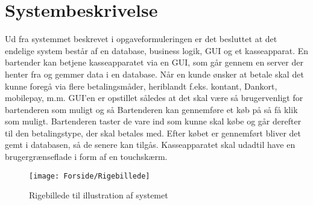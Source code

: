 \chapter{Systembeskrivelse}
Ud fra systemmet beskrevet i opgaveformuleringen er det besluttet at det endelige system består af en database, business logik, GUI og et kasseapparat. 
\newline
\newline
En bartender kan betjene kasseapparatet via en GUI, som går gennem en server der henter fra og gemmer data i en database.
Når en kunde ønsker at betale skal det kunne foregå via flere betalingsmåder, heriblandt f.eks. kontant, Dankort, mobilepay, m.m.
\newline
\newline
GUI'en er opstillet således at det skal være så brugervenligt for bartenderen som muligt og så Bartenderen kan gennemføre et køb på så få klik som muligt. Bartenderen taster de vare ind som kunne skal købe og går derefter til den betalingstype, der skal betales med. Efter købet er gennemført bliver det gemt i databasen, så de senere kan tilgås. 
\newline
\newline
Kasseapparatet skal udadtil have en brugergrænseflade i form af en touchskærm. 
                  
\begin{figure}[h]
    \centering
    \texttt{[image: Forside/Rigebillede]}
    \caption{Rigebillede til illustration af systemet}
    \label{fig:rig_billede}
\end{figure} 

